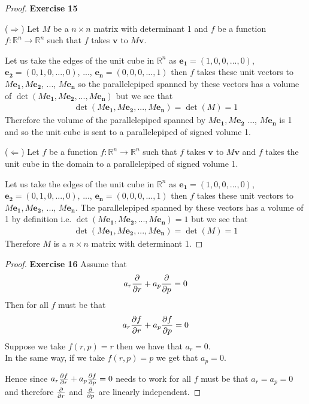 \documentclass[11pt]{article}
\newcommand{\R}{\mathbb{R}}
\theoremstyle{definition}
\begin{document}
\cleardoublepage
\begin{proof}{\textbf{Exercise 15}}

    ($\Rightarrow$) Let $M$ be a $n \times n$ matrix with determinant 1
    and $f$ be a function $f:\R^n \to \R^n$ such that $f$ takes $\bm{v}$ to
    $M\bm{v}$.
    
    Let us take the edges of the unit cube in $\R^n$ as
    $\bm{e_1} = (1, 0, 0, ..., 0)$, $\bm{e_2} = (0, 1, 0, ..., 0)$, ..., 
    $\bm{e_n} = (0, 0, 0, ..., 1)$ then $f$ takes these unit
    vectors to $M\bm{e_1}, M\bm{e_2}$, ..., $M\bm{e_n}$ so the parallelepiped
    spanned by these vectors has a volume of
    $\det(M\bm{e_1}, M\bm{e_2}, ..., M\bm{e_n})$ but we see that
    \begin{align*}
        \det(M\bm{e_1}, M\bm{e_2},..., M\bm{e_n})
        = \det(M) = 1 
    \end{align*}
    Therefore the volume of the parallelepiped spanned by $M\bm{e_1}, M\bm{e_2}$
    ..., $M\bm{e_n}$ is 1 and so the unit cube is sent to a parallelepiped of
    signed volume 1.

    ($\Leftarrow$) Let $f$ be a function $f:\R^n \to \R^n$ such that $f$ takes
    $\bm{v}$ to $M\bm{v}$ and $f$ takes the unit cube in the domain to 
    a parallelepiped of signed volume 1.

    Let us take the edges of the unit cube in $\R^n$ as
    $\bm{e_1} = (1, 0, 0, ..., 0)$, $\bm{e_2} = (0, 1, 0, ..., 0)$, ..., 
    $\bm{e_n} = (0, 0, 0, ..., 1)$ then $f$ takes these unit
    vectors to $M\bm{e_1}, M\bm{e_2}$, ..., $M\bm{e_n}$. The parallelepiped
    spanned by these vectors has a volume of 1 by definition i.e.
    $\det(M\bm{e_1}, M\bm{e_2}, ...,  M\bm{e_n}) = 1$ but we see that
    \begin{align*}
        \det(M\bm{e_1}, M\bm{e_2}, ..., M\bm{e_n})
        = \det(M) = 1 
    \end{align*}
    Therefore $M$ is a $n \times n$ matrix with determinant 1.
\end{proof}
\cleardoublepage
\begin{proof}{\textbf{Exercise 16}}
    Assume that
    \begin{align*}
        a_r\pdv{r} + a_p\pdv{p} = 0
    \end{align*}
    Then for all $f$ must be that
    \begin{align*}
        a_r\pdv{f}{r} + a_p\pdv{f}{p} = 0
    \end{align*}
    Suppose we take $f(r,p) = r$ then we have that $a_r = 0$.\\
    In the same way, if we take $f(r,p) = p$ we get that $a_p = 0$.

    Hence since $a_r\pdv{f}{r} + a_p\pdv{f}{p} = 0$
    needs to work for all $f$ must be that $a_r = a_p = 0$
    and therefore $\pdv{r}$ and $\pdv{p}$ are linearly independent.
\end{proof}
\end{document}
